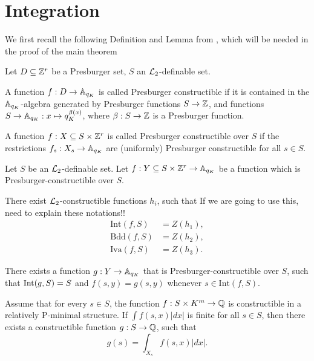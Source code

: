 \section{Integration}
We first recall the following Definition and Lemma from \cite{Clu-Gor-Hal-14}, which will be needed in the proof of the main theorem
\begin{defn}Let $D \subseteq \ZZ^r$ be a Presburger set, $S$ an $\Lm_2$-definable set.
\item A function $f: D \to \AA_{q_K}$ is called Presburger constructible if it is contained in the $\AA_{q_K}$-algebra generated by Presburger functions $S\to \ZZ$, and functions $S\to \AA_{q_K}: x \mapsto q_K^{\beta(x)}$, where $\beta:S \to \ZZ$ is a Presburger function.
\item A function $f:X\subseteq S \times \ZZ^r$ is called Presburger constructible over $S$ if  the restrictions $f_s: X_s \to \AA_{q_K}$ are (uniformly) Presburger constructible for all $s \in S$. 

\end{defn}
\begin{lem}\label{lemma:presburgerloci} Let $S$ be an $\Lm_2$-definable set. 
Let $f:Y\subseteq S\times \ZZ^r\to \AA_{q_K}$ be a function which is Presburger-constructible over $S$.
\item There exist $\Lm_2$-constructible functions $h_i$, such that {\color{red} If we are going to use this, need to explain these notations!!}
\begin{align*}
\text{Int}(f,S) &= Z(h_1),\\
\text{Bdd}(f,S) &= Z(h_2),\\
\text{Iva}(f,S) &= Z(h_3).
\end{align*}
\item There exists a function $g: Y \to \AA_{q_K}$ that is Presburger-constructible over $S$, such that $\Int(g,S) = S$ and $f(s,y) = g(s,y)$ whenever $s \in \text{Int}(f,S)$.
\end{lem}
\begin{thm}
Assume that for every $s \in S$, the function $f: S\times K^m \to \QQ$ is constructible in a relatively P-minimal structure. If $\int f(s,x)|dx|$ is finite for all $s \in S$, then there exists a constructible function $g: S \to \QQ$, such that
\[g(s) = \int_{X_s} f(s,x)|dx|.\]
\end{thm}
